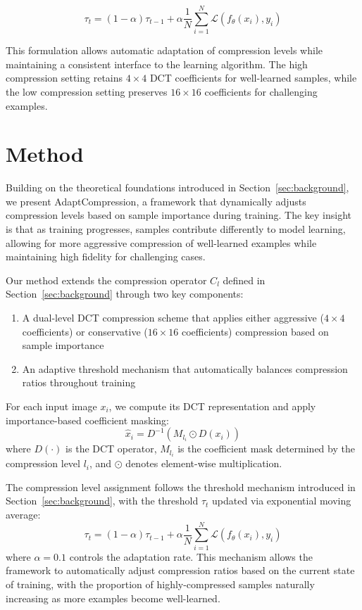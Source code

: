 \documentclass{article} %
\begin{document}
\begin{equation}
    \tau_t = (1-\alpha)\tau_{t-1} + \alpha\frac{1}{N}\sum_{i=1}^N \mathcal{L}(f_\theta(x_i), y_i)
\end{equation}

This formulation allows automatic adaptation of compression levels while maintaining a consistent interface to the learning algorithm. The high compression setting retains $4 \times 4$ DCT coefficients for well-learned samples, while the low compression setting preserves $16 \times 16$ coefficients for challenging examples.

\section{Method}
\label{sec:method}

Building on the theoretical foundations introduced in Section~\ref{sec:background}, we present AdaptCompression, a framework that dynamically adjusts compression levels based on sample importance during training. The key insight is that as training progresses, samples contribute differently to model learning, allowing for more aggressive compression of well-learned examples while maintaining high fidelity for challenging cases.

Our method extends the compression operator $C_l$ defined in Section~\ref{sec:background} through two key components:

\begin{enumerate}
    \item A dual-level DCT compression scheme that applies either aggressive ($4 \times 4$ coefficients) or conservative ($16 \times 16$ coefficients) compression based on sample importance
    \item An adaptive threshold mechanism that automatically balances compression ratios throughout training
\end{enumerate}

For each input image $x_i$, we compute its DCT representation and apply importance-based coefficient masking:
\begin{equation}
    \hat{x}_i = D^{-1}(M_{l_i} \odot D(x_i))
\end{equation}
where $D(\cdot)$ is the DCT operator, $M_{l_i}$ is the coefficient mask determined by the compression level $l_i$, and $\odot$ denotes element-wise multiplication.

The compression level assignment follows the threshold mechanism introduced in Section~\ref{sec:background}, with the threshold $\tau_t$ updated via exponential moving average:
\begin{equation}
    \tau_t = (1-\alpha)\tau_{t-1} + \alpha\frac{1}{N}\sum_{i=1}^N \mathcal{L}(f_\theta(x_i), y_i)
\end{equation}
where $\alpha=0.1$ controls the adaptation rate. This mechanism allows the framework to automatically adjust compression ratios based on the current state of training, with the proportion of highly-compressed samples naturally increasing as more examples become well-learned.
\end{document}
